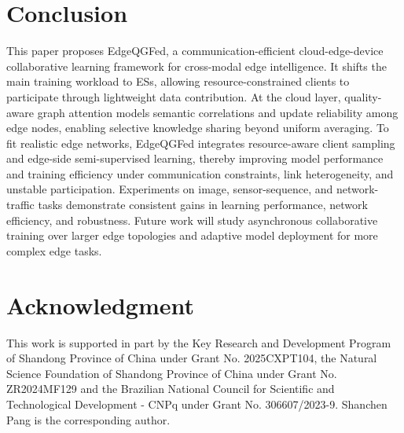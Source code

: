 ﻿\documentclass[10pt, conference, letterpaper]{ IEEEtran}
\begin{document}
\section{Conclusion}
This paper proposes EdgeQGFed, a communication-efficient cloud-edge-device collaborative learning framework for cross-modal edge intelligence. It shifts the main training workload to ESs, allowing resource-constrained clients to participate through lightweight data contribution. At the cloud layer, quality-aware graph attention models semantic correlations and update reliability among edge nodes, enabling selective knowledge sharing beyond uniform averaging. To fit realistic edge networks, EdgeQGFed integrates resource-aware client sampling and edge-side semi-supervised learning, thereby improving model performance and training efficiency under communication constraints, link heterogeneity, and unstable participation. Experiments on image, sensor-sequence, and network-traffic tasks demonstrate consistent gains in learning performance, network efficiency, and robustness. Future work will study asynchronous collaborative training over larger edge topologies and adaptive model deployment for more complex edge tasks.


\section*{Acknowledgment}
This work is supported in part by the Key Research and Development Program of Shandong Province of China under Grant No. 2025CXPT104, the Natural Science Foundation of Shandong Province of China under Grant No. ZR2024MF129 and the Brazilian National Council for Scientific and Technological Development - CNPq under Grant No. 306607/2023-9. Shanchen Pang is the corresponding author.

\balance


\end{document}
